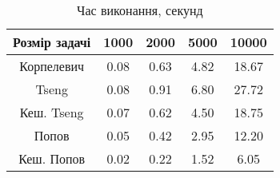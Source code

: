 \begin{table}[H]
	\centering
	\begin{tabular}{|c||c|c|c|c|}\hline
		Розмір задачі & 1000 & 2000 & 5000 & 10000 \\ \hline \hline
		Корпелевич & 0.08 & 0.63 & 4.82 & 18.67 \\ \hline
		Tseng & 0.08 & 0.91 & 6.80 & 27.72 \\ \hline
		Кеш. Tseng & 0.07 & 0.62 & 4.50 & 18.75 \\ \hline
		Попов & 0.05 & 0.42 & 2.95 & 12.20 \\ \hline
		Кеш. Попов & 0.02 & 0.22 & 1.52 & 6.05 \\ \hline
	\end{tabular}
	\caption{Час виконання, секунд}
\end{table}
